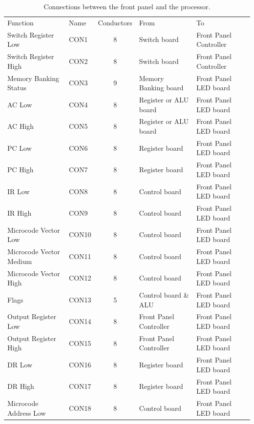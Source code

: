 \documentclass[11pt,a4paper,twocolumns]{article}
\newcommand\register[1]{\textsf{#1}}
\newcommand\A{\register{AC}}
\newcommand\DR{\register{DR}}
\newcommand\PC{\register{PC}}
\newcommand\IR{\register{IR}}
\begin{document}
\begin{table}[h!]
  \caption{\label{tab-connectors}Connections between the front panel
    and the processor.}
  \centering
  \begin{tabular}{llcll}
    \noalign{\smallskip}\hline\noalign{\smallskip}
    Function & Name & Conductors & From & To \\
    \noalign{\smallskip}\hline\noalign{\smallskip}
    Switch Register Low      & CON1  & 8 & Switch board & Front Panel Controller \\
    Switch Register High     & CON2  & 8 & Switch board & Front Panel Controller \\
    Memory Banking Status    & CON3  & 9 & Memory Banking board & Front Panel LED board \\
    \A{} Low                 & CON4  & 8 & Register or ALU board & Front Panel LED board \\
    \A{} High                & CON5  & 8 & Register or ALU board & Front Panel LED board \\
    \PC{} Low                & CON6  & 8 & Register board & Front Panel LED board \\
    \PC{} High               & CON7  & 8 & Register board & Front Panel LED board \\
    \IR{} Low                & CON8  & 8 & Control board & Front Panel LED board \\
    \IR{} High               & CON9  & 8 & Control board & Front Panel LED board \\
    Microcode Vector Low     & CON10 & 8 & Control board & Front Panel LED board \\
    Microcode Vector Medium  & CON11 & 8 & Control board & Front Panel LED board \\
    Microcode Vector High    & CON12 & 8 & Control board & Front Panel LED board \\
    Flags                    & CON13 & 5 & Control board \& ALU & Front Panel LED board \\
    Output Register Low      & CON14 & 8 & Front Panel Controller & Front Panel LED board \\
    Output Register High     & CON15 & 8 & Front Panel Controller & Front Panel LED board \\
    \DR{} Low                & CON16 & 8 & Register board & Front Panel LED board \\
    \DR{} High               & CON17 & 8 & Register board & Front Panel LED board \\
    Microcode Address Low    & CON18 & 8 & Control board & Front Panel LED board \\

\end{tabular}
\end{table}
\end{document}
